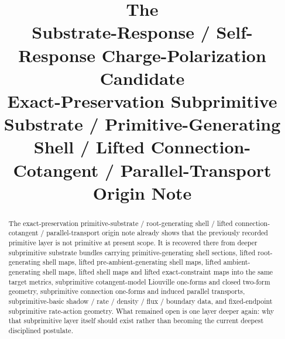 \documentclass[11pt]{article}
\title{\textbf{The \TheoryName{}}\\[0.4em]
\large Substrate-Response / Self-Response Charge-Polarization Candidate\\
\large Exact-Preservation Subprimitive Substrate / Primitive-Generating Shell / Lifted Connection-Cotangent / Parallel-Transport\\
\large Origin Note}
\author{}
\date{}
\begin{document}
\maketitle

\begin{abstract}
The exact-preservation primitive-substrate / root-generating shell / lifted connection-cotangent / parallel-transport origin note already shows that the previously recorded primitive layer is not primitive at present scope. It is recovered there from deeper subprimitive substrate bundles carrying primitive-generating shell sections, lifted root-generating shell maps, lifted pre-ambient-generating shell maps, lifted ambient-generating shell maps, lifted shell maps and lifted exact-constraint maps into the same target metrics, subprimitive cotangent-model Liouville one-forms and closed two-form geometry, subprimitive connection one-forms and induced parallel transports, subprimitive-basic shadow / rate / density / flux / boundary data, and fixed-endpoint subprimitive rate-action geometry. What remained open is one layer deeper again: why that subprimitive layer itself should exist rather than becoming the current deepest disciplined postulate.


\end{abstract}
\end{document}
